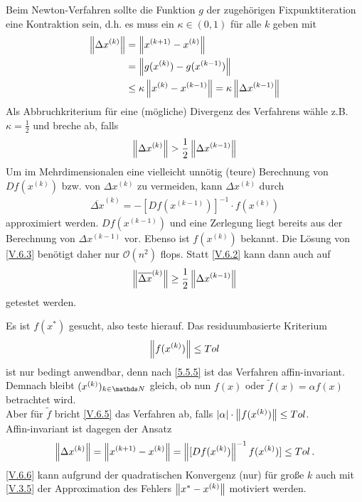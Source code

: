 Beim Newton-Verfahren sollte die Funktion $g$ der zugehörigen
Fixpunktiteration eine Kontraktion sein, d.h. es muss ein 
$\kappa \in (0,1)$ für alle $k$ geben mit
\begin{align}\nonumber
  \nn[\Delta x^{(k)}]&=\nn[x^{(k+1)}-x^{(k)}] \\ \nonumber
                     &= \nn[g(x^{(k)})-g(x^{(k-1)})]\\
                     &\leq \kappa\nn[x^{(k)}-x^{(k-1)}] = \kappa \nn[\Delta x^{(k-1)}]
                       \label{V.6.1}
\end{align}
Als Abbruchkriterium für eine (mögliche) Divergenz des Verfahrens wähle z.B.
$\kappa=\frac{1}{2}$ und breche ab, falls 
\begin{gather}
  \nn[\Delta x^{(k)}]>\frac{1}{2}\nn[\Delta x^{(k-1)}]
  \label{V.6.2}
\end{gather}
Um im Mehrdimensionalen eine vielleicht unnötig (teure) Berechnung
von $Df(x^{(k)})$ bzw. von $\Delta x^{(k)}$ zu vermeiden, kann 
$\Delta x^{(k)}$ durch 
\begin{gather}
  \overline{\Delta x}^{(k)} = -[Df(x^{(k-1)})]^{-1}\cdot f(x^{(k)})
  \label{V.6.3}
\end{gather}
approximiert werden.
$Df(x^{(k-1)})$ und eine Zerlegung liegt bereits aus der Berechnung von $\Delta x^{(k-1)}$ vor.
Ebenso ist $f(x^{(k)})$ bekannt.
Die Lösung von \eqref{V.6.3} benötigt daher nur $\mathcal{O}(n^2)$ flops.
Statt \eqref{V.6.2} kann dann auch auf 
\begin{gather}
  \nn[\overline{\Delta x}^{(k)}] \geq \frac{1}{2} \nn[\Delta x^{(k-1)}]
  \label{V.6.4}
\end{gather}
getestet werden.


Es ist $f(x^{*})$ gesucht, also teste hierauf. Das residuumbasierte Kriterium
\begin{gather}
  \nn[f(x^{(k)})]\leq Tol
  \label{V.6.5}
\end{gather}
ist nur bedingt anwendbar, denn nach \ref{5.5.5} ist das Verfahren affin-invariant.
Demnach bleibt $(x^{(k)})_{k\in\N}$ gleich,
ob nun $f(x)$ oder $\widetilde{f}(x) =\alpha f(x) $ betrachtet wird.\\
Aber für $\widetilde{f}$ bricht \eqref{V.6.5} das Verfahren ab, 
falls $|\alpha|\cdot \nn[f(x^{(k)})] \leq Tol$. \\
Affin-invariant ist dagegen der Ansatz
\begin{gather}
  \nn[\Delta x^{(k)}]= \nn[x^{(k+1)}-x^{(k)}] 
  = \nn[[Df(x^{(k)})]^{-1}f(x^{(k)})] 
  \leq Tol \, .
  \label{V.6.6}
\end{gather}
\eqref{V.6.6} kann aufgrund der quadratischen Konvergenz (nur) für 
große $k$ auch mit \eqref{V.3.5} der Approximation des Fehlers 
$\nn[x^{*}-x^{(k)}] $ motiviert werden.


